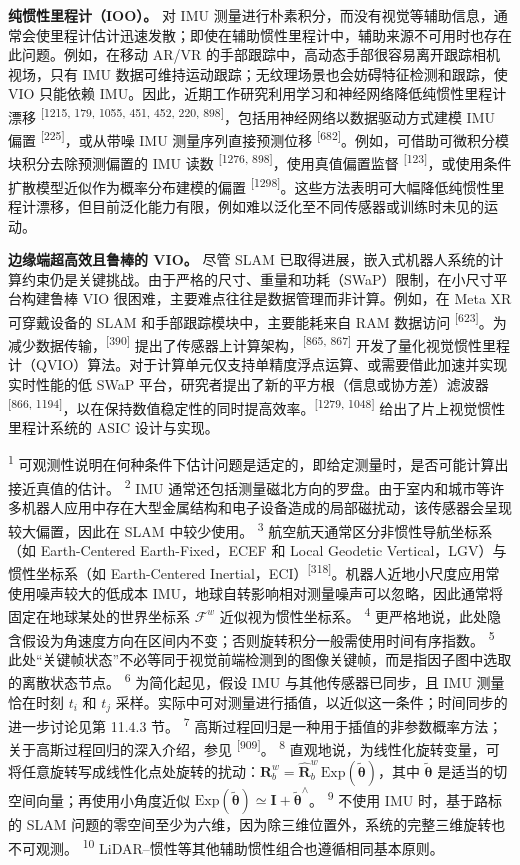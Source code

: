 \textbf{纯惯性里程计（IOO）。} 对 IMU 测量进行朴素积分，而没有视觉等辅助信息，通常会使里程计估计迅速发散；即使在辅助惯性里程计中，辅助来源不可用时也存在此问题。例如，在移动 AR/VR 的手部跟踪中，高动态手部很容易离开跟踪相机视场，只有 IMU 数据可维持运动跟踪；无纹理场景也会妨碍特征检测和跟踪，使 VIO 只能依赖 IMU。因此，近期工作研究利用学习和神经网络降低纯惯性里程计漂移 \textsuperscript{[1215, 179, 1055, 451, 452, 220, 898]}，包括用神经网络以数据驱动方式建模 IMU 偏置 \textsuperscript{[225]}，或从带噪 IMU 测量序列直接预测位移 \textsuperscript{[682]}。例如，可借助可微积分模块积分去除预测偏置的 IMU 读数 \textsuperscript{[1276, 898]}，使用真值偏置监督 \textsuperscript{[123]}，或使用条件扩散模型近似作为概率分布建模的偏置 \textsuperscript{[1298]}。这些方法表明可大幅降低纯惯性里程计漂移，但目前泛化能力有限，例如难以泛化至不同传感器或训练时未见的运动。

\textbf{边缘端超高效且鲁棒的 VIO。} 尽管 SLAM 已取得进展，嵌入式机器人系统的计算约束仍是关键挑战。由于严格的尺寸、重量和功耗（SWaP）限制，在小尺寸平台构建鲁棒 VIO 很困难，主要难点往往是数据管理而非计算。例如，在 Meta XR 可穿戴设备的 SLAM 和手部跟踪模块中，主要能耗来自 RAM 数据访问 \textsuperscript{[623]}。为减少数据传输，\textsuperscript{[390]} 提出了传感器上计算架构，\textsuperscript{[865, 867]} 开发了量化视觉惯性里程计（QVIO）算法。对于计算单元仅支持单精度浮点运算、或需要借此加速并实现实时性能的低 SWaP 平台，研究者提出了新的平方根（信息或协方差）滤波器 \textsuperscript{[866, 1194]}，以在保持数值稳定性的同时提高效率。\textsuperscript{[1279, 1048]} 给出了片上视觉惯性里程计系统的 ASIC 设计与实现。

\textsuperscript{1} 可观测性说明在何种条件下估计问题是适定的，即给定测量时，是否可能计算出接近真值的估计。
\textsuperscript{2} IMU 通常还包括测量磁北方向的罗盘。由于室内和城市等许多机器人应用中存在大型金属结构和电子设备造成的局部磁扰动，该传感器会呈现较大偏置，因此在 SLAM 中较少使用。
\textsuperscript{3} 航空航天通常区分非惯性导航坐标系（如 Earth-Centered Earth-Fixed，ECEF 和 Local Geodetic Vertical，LGV）与惯性坐标系（如 Earth-Centered Inertial，ECI）\textsuperscript{[318]}。机器人近地小尺度应用常使用噪声较大的低成本 IMU，地球自转影响相对测量噪声可以忽略，因此通常将固定在地球某处的世界坐标系 $\mathcal{F}^w$ 近似视为惯性坐标系。
\textsuperscript{4} 更严格地说，此处隐含假设为角速度方向在区间内不变；否则旋转积分一般需使用时间有序指数。
\textsuperscript{5} 此处“关键帧状态”不必等同于视觉前端检测到的图像关键帧，而是指因子图中选取的离散状态节点。
\textsuperscript{6} 为简化起见，假设 IMU 与其他传感器已同步，且 IMU 测量恰在时刻 $t_i$ 和 $t_j$ 采样。实际中可对测量进行插值，以近似这一条件；时间同步的进一步讨论见第 11.4.3 节。
\textsuperscript{7} 高斯过程回归是一种用于插值的非参数概率方法；关于高斯过程回归的深入介绍，参见 \textsuperscript{[909]}。
\textsuperscript{8} 直观地说，为线性化旋转变量，可将任意旋转写成线性化点处旋转的扰动：$\boldsymbol R_b^w=\hat{\boldsymbol R}_b^w\,\mathrm{Exp}(\tilde{\boldsymbol\theta})$，其中 $\tilde{\boldsymbol\theta}$ 是适当的切空间向量；再使用小角度近似 $\mathrm{Exp}(\tilde{\boldsymbol\theta})\simeq\mathbf I+\tilde{\boldsymbol\theta}^{\wedge}$。
\textsuperscript{9} 不使用 IMU 时，基于路标的 SLAM 问题的零空间至少为六维，因为除三维位置外，系统的完整三维旋转也不可观测。
\textsuperscript{10} LiDAR--惯性等其他辅助惯性组合也遵循相同基本原则。
